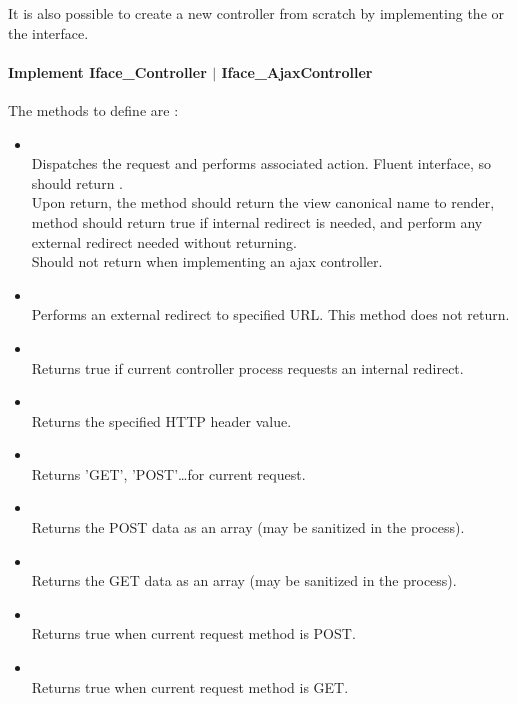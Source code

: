 \documentclass[pdftex,12pt,a4paper]{article}
\begin{document}
It is also possible to create a new controller from scratch by implementing the  or the  interface.

\paragraph{Implement Iface\_Controller $|$ Iface\_AjaxController}

The methods to define are :
\begin{itemize}
	\item {} \hfill \\
	Dispatches the request and performs associated action. Fluent interface, so should return .\\
	Upon return, the  method should return the view canonical name to render,  method should return true if internal redirect is needed,
	and perform any external redirect needed without returning. \\
	Should not return when implementing an ajax controller.
	\item {} \hfill \\
	Performs an external redirect to specified URL. This method does not return.
	\item {} \hfill \\
	Returns true if current controller process requests an internal redirect.
	\item {} \hfill \\
	Returns the specified HTTP header value.
	\item {} \hfill \\
	Returns 'GET', 'POST'\ldots for current request.
	\item {} \hfill \\
	Returns the POST data as an array (may be sanitized in the process).
	\item {} \hfill \\
	Returns the GET data as an array (may be sanitized in the process).
	\item {} \hfill \\
	Returns true when current request method is POST.
	\item {} \hfill \\
	Returns true when current request method is GET.

\end{itemize}
\end{document}
